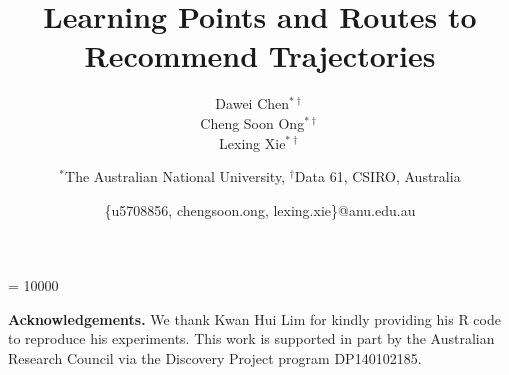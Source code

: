 \documentclass{sig-alternate-05-2015}
\begin{document}

\widowpenalty = 10000

\title{Learning Points and Routes to Recommend Trajectories}

\author{
    \alignauthor Dawei Chen$^{*\dagger}$\\
    \alignauthor Cheng Soon Ong$^{*\dagger}$\\
    \alignauthor Lexing Xie$^{*\dagger}$\\
    \and
    $^*$The Australian National University, $^\dagger$Data 61, CSIRO, Australia\\
    \and
    \{u5708856, chengsoon.ong, lexing.xie\}@anu.edu.au
}


\maketitle

\begin{abstract}

\end{abstract}









\vspace{0.5em}
\noindent
\textbf{Acknowledgements.}
We thank Kwan Hui Lim for kindly providing his R code to reproduce his experiments.
This work is supported in part by the Australian Research Council via the Discovery Project program DP140102185. 


{\small


}


\end{document}
